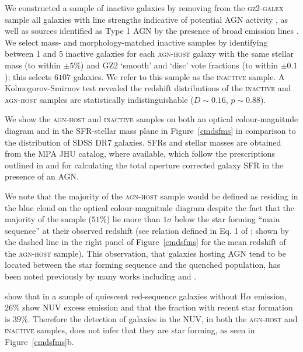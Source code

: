 \documentclass[useAMS,usenatbib]{mn2e}
\def\changed    {\color{nc} }
\def\newref    {\color{new} }
\begin{document}
We constructed a sample of inactive galaxies by removing from the \textsc{gz2-galex} sample {\changed all galaxies with line strengths indicative of potential AGN activity \citep*{Kauff03b}}, as well as sources identified as Type 1 AGN by the presence of broad emission lines \citep{Oh15}. {\changed We select mass- and morphology-matched inactive samples by identifying between 1 and 5 inactive galaxies for each \textsc{agn-host} galaxy with the same stellar mass (to within $\pm5\%$) and GZ2 `smooth' and `disc' vote fractions (to within $\pm 0.1$); this selects $6107$ galaxies.} We refer to this sample as the \textsc{inactive} sample. A Kolmogorov-Smirnov test revealed the redshift distributions of the \textsc{inactive} and \textsc{agn-host} samples are statistically indistinguishable ($D \sim 0.16$, $p \sim 0.88$). 


{\newref We show the \textsc{agn-host} and \textsc{inactive}  samples on both an optical colour-magnitude diagram and in the SFR-stellar mass plane in Figure~\ref{cmdsfms} in comparison to the distribution of SDSS DR7 galaxies. SFRs and stellar masses are obtained from the MPA JHU catalog, where available, which follow the prescriptions outlined in \cite{Brinch04} and \cite{Salim07} for calculating the total aperture corrected galaxy SFR in the presence of an AGN. 

We note that the majority of the \textsc{agn-host} sample would be defined as residing in the blue cloud on the optical colour-magnitude diagram despite the fact that the majority of the sample ($51\%$) lie more than $1\sigma$ below the star forming ``main sequence'' at their observed redshift (see relation defined in Eq. 1 of \cite{Peng10}; shown by the dashed line in the right panel of Figure~\ref{cmdsfms} for the mean redshift of the \textsc{agn-host} sample). This observation, that galaxies hosting AGN tend to be located between the star forming sequence and the quenched population, has been noted previously by many works including \citet{Salim07,Sch2010, Shimzu15} and \citet{Ellison16}. }

{\newref \cite{Ko13} show that in a sample of quiescent red-sequence galaxies without $\mathrm{H}\alpha$ emission, $26\%$ show NUV excess emission and that the fraction with recent star formation is $39\%$. Therefore the detection of galaxies in the NUV, in both the \textsc{agn-host} and \textsc{inactive} samples, does not infer that they are star forming, as seen in Figure~\ref{cmdsfms}b.}
\end{document}
